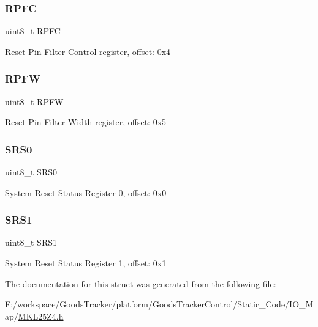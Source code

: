 \mbox{\label{struct_r_c_m___mem_map_afbe59a267584c8d35fe61a861e753155}} 
\subsubsection{\texorpdfstring{R\+P\+FC}{RPFC}}
{\footnotesize\ttfamily uint8\+\_\+t R\+P\+FC}

Reset Pin Filter Control register, offset\+: 0x4 \mbox{\label{struct_r_c_m___mem_map_a8c3111caa4359258a32cb7db2b456445}} 
\subsubsection{\texorpdfstring{R\+P\+FW}{RPFW}}
{\footnotesize\ttfamily uint8\+\_\+t R\+P\+FW}

Reset Pin Filter Width register, offset\+: 0x5 \mbox{\label{struct_r_c_m___mem_map_a72cc435004865ba66a0ca44630f10fd3}} 
\subsubsection{\texorpdfstring{S\+R\+S0}{SRS0}}
{\footnotesize\ttfamily uint8\+\_\+t S\+R\+S0}

System Reset Status Register 0, offset\+: 0x0 \mbox{\label{struct_r_c_m___mem_map_a17104acf49b7e08ee75c675987528f92}} 
\subsubsection{\texorpdfstring{S\+R\+S1}{SRS1}}
{\footnotesize\ttfamily uint8\+\_\+t S\+R\+S1}

System Reset Status Register 1, offset\+: 0x1 

The documentation for this struct was generated from the following file\+:\begin{DoxyCompactItemize}
\item 
F\+:/workspace/\+Goods\+Tracker/platform/\+Goods\+Tracker\+Control/\+Static\+\_\+\+Code/\+I\+O\+\_\+\+Map/\hyperlink{_m_k_l25_z4_8h}{M\+K\+L25\+Z4.\+h}\end{DoxyCompactItemize}
